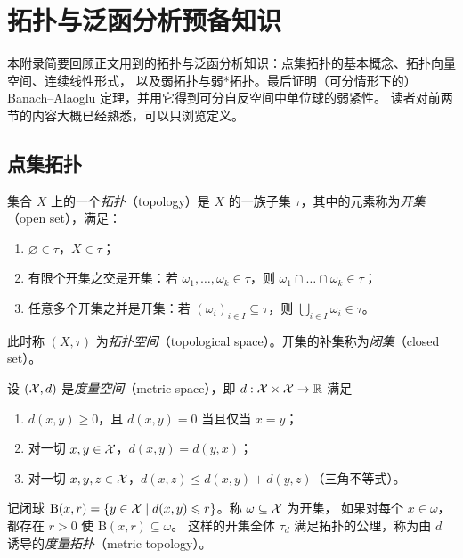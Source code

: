 \chapter{拓扑与泛函分析预备知识}
\label{ch:appA}

\providecommand{\Xss}{\mathcal{X}^{**}}

本附录简要回顾正文用到的拓扑与泛函分析知识：点集拓扑的基本概念、拓扑向量空间、连续线性形式，
以及弱拓扑与弱*拓扑。最后证明（可分情形下的）Banach--Alaoglu 定理，并用它得到可分自反空间中单位球的弱紧性。
读者对前两节的内容大概已经熟悉，可以只浏览定义。

\section{点集拓扑}

\begin{definition}[拓扑]
\label{def:28}
集合 $X$ 上的一个\emph{拓扑}（topology）是 $X$ 的一族子集 $\tau$，其中的元素称为\emph{开集}（open set），满足：
\begin{enumerate}[label=(\roman*)]
  \item $\varnothing\in\tau$，$X\in\tau$；
  \item 有限个开集之交是开集：若 $\omega_1,\dots,\omega_k\in\tau$，则 $\omega_1\cap\dots\cap\omega_k\in\tau$；
  \item 任意多个开集之并是开集：若 $(\omega_i)_{i\in I}\subseteq\tau$，则 $\bigcup_{i\in I}\omega_i\in\tau$。
\end{enumerate}
此时称 $(X,\tau)$ 为\emph{拓扑空间}（topological space）。开集的补集称为\emph{闭集}（closed set）。
\end{definition}

\begin{example}[度量拓扑]
\label{exa:26}
设 $(\mathcal{X},d)$ 是\emph{度量空间}（metric space），即 $d:\mathcal{X}\times\mathcal{X}\to\mathbb{R}$ 满足
\begin{enumerate}[label=(\roman*)]
  \item $d(x,y)\geqslant 0$，且 $d(x,y)=0$ 当且仅当 $x=y$；
  \item 对一切 $x,y\in\mathcal{X}$，$d(x,y)=d(y,x)$；
  \item 对一切 $x,y,z\in\mathcal{X}$，$d(x,z)\leqslant d(x,y)+d(y,z)$（三角不等式）。
\end{enumerate}
记闭球 $\mathrm{B}(x,r)=\{y\in\mathcal{X}\mid d(x,y)\leqslant r\}$。称 $\omega\subseteq\mathcal{X}$ 为开集，
如果对每个 $x\in\omega$，都存在 $r>0$ 使 $\mathrm{B}(x,r)\subseteq\omega$。
这样的开集全体 $\tau_d$ 满足拓扑的公理，称为由 $d$ 诱导的\emph{度量拓扑}（metric topology）。
\end{example}


